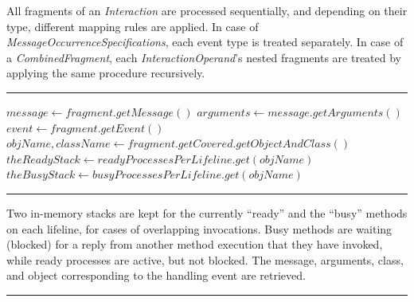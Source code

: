\documentclass[letter]{llncs}
\begin{document}
All fragments of an \emph{Interaction} are processed sequentially, and depending on their type,
different mapping rules are applied. In case of \emph{MessageOccurrenceSpecifications}, each event type is treated separately.
In case of a \emph{CombinedFragment}, each \emph{InteractionOperand}'s nested fragments are treated by applying the same procedure recursively.
\vspace{-4 pt}
\hrule
{}
\begin{algorithmic}[1]
  \State $message \gets fragment.getMessage()$
  \State $arguments \gets message.getArguments()$
  \State $event \gets fragment.getEvent()$
  \State $objName,className \gets fragment.getCovered.getObjectAndClass()$
  \State $theReadyStack \gets readyProcessesPerLifeline.get(objName)$
  \State $theBusyStack \gets busyProcessesPerLifeline.get(objName)$
\end{algorithmic}
\hrule
Two in-memory stacks are kept for the currently ``ready'' and the ``busy'' methods on each lifeline, for cases of overlapping invocations.
Busy methods are waiting (blocked) for a reply from another method execution that they have invoked, while ready processes are active, but not blocked.
The message, arguments, class, and object corresponding to the handling event are retrieved.
\vspace{2 pt}
\hrule
\end{document}
